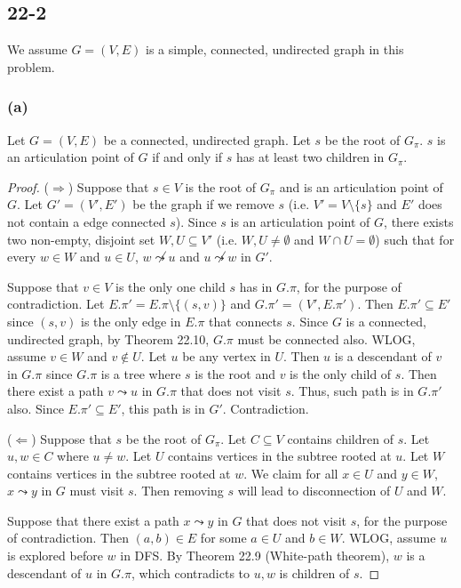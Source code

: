 \subsection*{22-2}

We assume $G = (V,E)$ is a simple, connected, undirected graph
in this problem.

\subsubsection*{(a)}

\begin{claim}
    Let $G = (V,E)$ be a connected, undirected graph.
    Let $s$ be the root of $G_\pi$.
    $s$ is an articulation point of $G$ if and only if
    $s$ has at least two children in $G_\pi$.
\end{claim}

\begin{proof}
    ($\Longrightarrow$)
    Suppose that $s \in V$ is the root of $G_\pi$ 
    and is an articulation point of $G$.
    Let $G' = (V',E')$ be the graph if we remove $s$
    (i.e. $V' = V \setminus \{ s \}$ 
    and $E'$ does not contain a edge connected $s$).
    Since $s$ is an articulation point of $G$,
    there exists two non-empty, disjoint set $W, U \subseteq V'$
    (i.e. $W, U \neq \emptyset$ and $W \cap U = \emptyset$)
    such that for every $w \in W$ and $u \in U$,
    $w \not\leadsto u$ and $u \not\leadsto w$
    in $G'$.

    Suppose that $v \in V$ is the only one child $s$ has in $G.\pi$,
    for the purpose of contradiction.
    Let $E.\pi' = E.\pi \setminus \{ (s,v) \}$
    and $G.\pi' = (V',E.\pi')$.
    Then $E.\pi' \subseteq E'$
    since $(s,v)$ is the only edge in $E.\pi$ that connects $s$.
    Since $G$ is a connected, undirected graph,
    by Theorem 22.10,
    $G.\pi$ must be connected also.
    WLOG, assume $v \in W$ and $v \notin U$.
    Let $u$ be any vertex in $U$.
    Then $u$ is a descendant of $v$ in $G.\pi$
    since $G.\pi$ is a tree 
    where $s$ is the root and $v$ is the only child of $s$.
    Then there exist a path $v \leadsto u$ in $G.\pi$
    that does not visit $s$.
    Thus, such path is in $G.\pi'$ also.
    Since $E.\pi' \subseteq E'$,
    this path is in $G'$.
    Contradiction.

    ($\Longleftarrow$)
    Suppose that $s$ be the root of $G_\pi$.
    Let $C \subseteq V$ contains children of $s$.
    Let $u,w \in C$ where $u \neq w$.
    Let $U$ contains vertices in the subtree rooted at $u$.
    Let $W$ contains vertices in the subtree rooted at $w$.
    We claim for all $x \in U$ and $y \in W$,
    $x \leadsto y$ in $G$ must visit $s$.
    Then removing $s$ will lead to disconnection of $U$ and $W$.

    Suppose that there exist a path $x \leadsto y$ in $G$
    that does not visit $s$, for the purpose of contradiction.
    Then $(a,b) \in E$ for some $a \in U$ and $b \in W$.
    WLOG, assume $u$ is explored before $w$ in DFS.
    By Theorem 22.9 (White-path theorem),
    $w$ is a descendant of $u$ in $G.\pi$,
    which contradicts to $u,w$ is children of $s$.
\end{proof}

